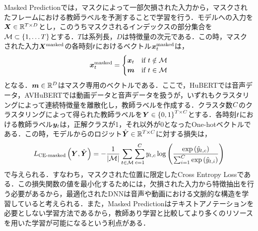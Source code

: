 Masked Predictionでは，マスクによって一部欠損された入力から，マスクされたフレームにおける教師ラベルを予測することで学習を行う．モデルへの入力を$\bm{X} \in \mathbb{R}^{T \times D}$とし，このうちマスクされるインデックスの部分集合を$\mathcal{M} \subset \left\{1, \ldots T\right\}$とする．$T$は系列長，$D$は特徴量の次元である．この時，マスクされた入力$\bm{X}^{\text{masked}}$の各時刻$t$におけるベクトル$\bm{x}^{\text{masked}}_{t}$は，
\begin{equation}
    \bm{x}^{\text{masked}}_{t} =
    \begin{cases}
        \bm{x}_{t} & \text{if $t \notin \mathcal{M}$} \\
        \bm{m}                        & \text{if $t \in \mathcal{M}$}
    \end{cases}
\end{equation}
となる．$\bm{m} \in \mathbb{R}^{D}$はマスク専用のベクトルである．ここで，HuBERTでは音声データ，AVHuBERTでは動画データと音声データを扱うが，いずれもクラスタリングによって連続特徴量を離散化し，教師ラベルを作成する．クラスタ数$C$のクラスタリングによって得られた教師ラベルを$\bm{Y} \in \left\{0, 1\right\}^{T \times C}$とする．各時刻$t$における教師ラベル$\bm{y}_{t}$は，正解クラスが1，それ以外が0となったOne-hotベクトルである．この時，モデルからのロジット$\hat{\bm{Y}} \in \mathbb{R}^{T \times C}$に対する損失は，
\begin{equation}
    L_{\text{CE-masked}}\left(\bm{Y}, \hat{\bm{Y}}\right) =
    - \frac{1}{\left|\mathcal{M}\right|} \sum_{t \in \mathcal{M}} \sum_{c = 1}^{C} y_{t, c} \log \left(\frac{\exp\left(\hat{y}_{t, c}\right)}{\sum_{i = 1}^{C} \exp\left(\hat{y}_{t, i}\right)}\right)
\end{equation}
で与えられる．すなわち，マスクされた位置に限定したCross Entropy Lossである．この損失関数の値を最小化するためには，欠損された入力から特徴抽出を行う必要があるから，最適化されたDNNは音声や動画における文脈的な構造を学習していると考えられる．また，Masked Predictionはテキストアノテーションを必要としない学習方法であるから，教師あり学習と比較してより多くのリソースを用いた学習が可能になるという利点がある．
